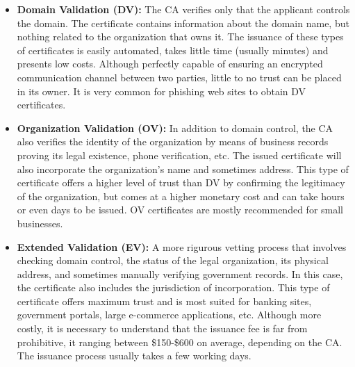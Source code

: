 \begin{itemize}
    \item \textbf{Domain Validation (DV):} The CA verifies only that the
          applicant controls the domain. The certificate contains information
          about the domain name, but nothing related to the organization that
          owns it. The issuance of these types of certificates is easily
          automated, takes little time (usually minutes) and presents low costs.
          Although perfectly capable of ensuring an encrypted communication
          channel between two parties, little to no trust can be placed in its
          owner. It is very common for phishing web sites to obtain DV
          certificates.

    \item \textbf{Organization Validation (OV):} In addition to domain control,
          the CA also verifies the identity of the organization by means of
          business records proving its legal existence, phone verification, etc.
          The issued certificate will also incorporate the organization's name
          and sometimes address. This type of certificate offers a higher
          level of trust than DV by confirming the legitimacy of the
          organization, but comes at a higher monetary cost and can take hours
          or even days to be issued. OV certificates are mostly recommended for
          small businesses.

    \item \textbf{Extended Validation (EV):} A more rigurous vetting process
          that involves checking domain control, the status of the legal
          organization, its physical address, and sometimes manually verifying
          government records. In this case, the certificate also includes the
          jurisdiction of incorporation. This type of certificate offers
          maximum trust and is most suited for banking sites, government
          portals, large e-commerce applications, etc. Although more costly, it
          is necessary to understand that the issuance fee is far from
          prohibitive, it ranging between \$150-\$600 on average, depending on
          the CA. The issuance process usually takes a few working days.
\end{itemize}

